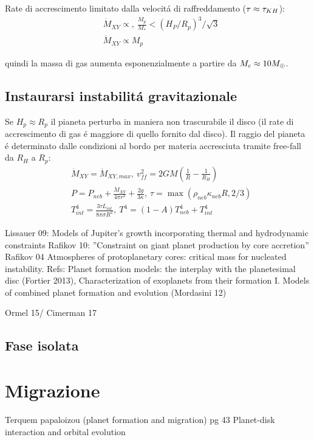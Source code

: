 Rate di accrescimento limitato dalla velocit\'a di raffreddamento ($\tau\approx\tau_{KH}{}$):
\begin{align}
&\dot{M}_{XY}\propto,\ \frac{M_p}{M_*}<(H_P/R_p)^3/\sqrt{3}\\
&\dot{M}_{XY}\propto M_p
\end{align}

quindi la massa di gas aumenta esponenzialmente a partire da $M_c\approx10M_{\oplus}{}$.

\section{Instaurarsi instabilit\'a gravitazionale}

Se $H_p\approx R_p$ il pianeta perturba in maniera non trascurabile il disco (il rate di accrescimento di gas \'e maggiore di quello fornito dal disco). Il raggio del pianeta \'e determinato dalle condizioni al bordo per materia accresciuta tramite free-fall da $R_H$ a $R_p$:
\begin{align}
&\dot{M}_{XY}=\dot{M}_{XY,max},\ v_{ff}^2=2GM(\frac{1}{R}-\frac{1}{R_H})\\
&P=P_{neb}+\frac{\dot{M}_{XY}}{4\pi r^2}+\frac{2g}{3\kappa},\ \tau=\max{(\rho_{neb}\kappa_{neb}R,2/3)}\\
&T_{int}^4=\frac{3\tau L_{int}}{8\pi\sigma R^2},\ T^4=(1-A)T_{neb}^4+T_{int}^4
\end{align}


\begin{workout}
Lissauer 09: Models of Jupiter’s growth incorporating thermal and hydrodynamic constraints
Rafikov 10: ''Constraint on giant planet production by core accretion''
Rafikov 04 Atmospheres of protoplanetary cores: critical mass for nucleated instability.
Refs: Planet formation models: the interplay with the planetesimal disc (Fortier 2013), Characterization of exoplanets from their formation I. Models of combined planet formation and evolution (Mordasini 12)
\end{workout}

\begin{workout}
Ormel 15/ Cimerman 17
\end{workout}

\section{Fase isolata}

{\let\clearpage\relax\let\cleardoublepage\relax
\chapter{Migrazione}
}
Terquem papaloizou (planet formation and migration) pg 43
Planet-disk interaction and orbital evolution


